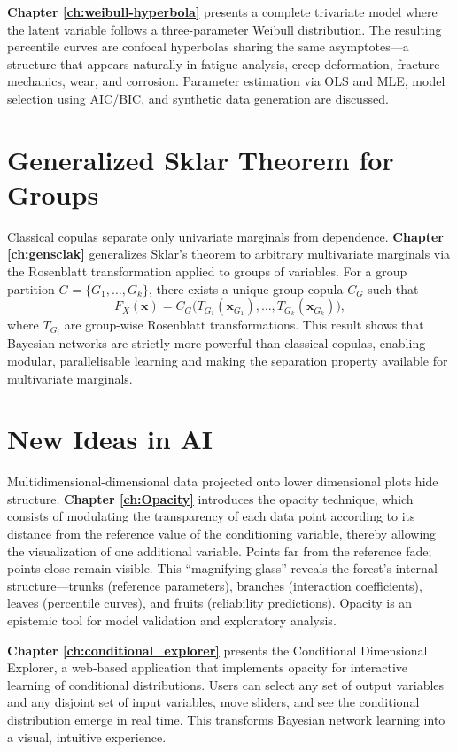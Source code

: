 \textbf{Chapter \ref{ch:weibull-hyperbola}} presents a complete trivariate model where the latent variable follows a three-parameter Weibull distribution. The resulting percentile curves are confocal hyperbolas sharing the same asymptotes—a structure that appears naturally in fatigue analysis, creep deformation, fracture mechanics, wear, and corrosion. Parameter estimation via OLS and MLE, model selection using AIC/BIC, and synthetic data generation are discussed.

\section{Generalized Sklar Theorem for Groups}
Classical copulas separate only univariate marginals from dependence. \textbf{Chapter \ref{ch:gensclak}} generalizes Sklar’s theorem to arbitrary multivariate marginals via the Rosenblatt transformation applied to groups of variables. For a group partition \(G = \{G_1,\ldots,G_k\}\), there exists a unique group copula \(C_G\) such that
\[
F_X(\mathbf{x}) = C_G\bigl(T_{G_1}(\mathbf{x}_{G_1}),\ldots,T_{G_k}(\mathbf{x}_{G_k})\bigr),
\]
where \(T_{G_i}\) are group-wise Rosenblatt transformations. This result shows that Bayesian networks are strictly more powerful than classical copulas, enabling modular, parallelisable learning and making the separation property available for multivariate marginals.

\section{New Ideas in AI}
Multidimensional-dimensional data projected onto lower dimensional plots hide structure. \textbf{Chapter \ref{ch:Opacity}} introduces the opacity technique, which consists of modulating the transparency of each data point according to its distance from the reference value of the conditioning variable, thereby allowing the visualization of one additional variable.  Points far from the reference fade; points close remain visible. This “magnifying glass” reveals the forest’s internal structure—trunks (reference parameters), branches (interaction coefficients), leaves (percentile curves), and fruits (reliability predictions). Opacity is an epistemic tool for model validation and exploratory analysis.

\textbf{Chapter \ref{ch:conditional_explorer}} presents the Conditional Dimensional Explorer, a web‑based application that implements opacity for interactive learning of conditional distributions. Users can select any set of output variables and any disjoint set of input variables, move sliders, and see the conditional distribution emerge in real time. This transforms Bayesian network learning into a visual, intuitive experience.

